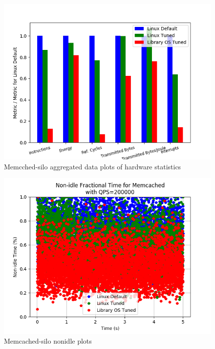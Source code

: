 \documentclass[pageno]{jpaper}
\begin{document}
\begin{figure}
	\includegraphics[width=\columnwidth]{asplos2021_figures/mcdsilo_combined_barplot_QPS200000.png}
	\caption{Memcched-silo aggregated data plots of hardware statistics}
\end{figure}
\begin{figure}
	\includegraphics[width=\columnwidth]{asplos2021_figures/mcdsilo_nonidle_QPS200000.png}
	\caption{Memcached-silo nonidle plots}
\end{figure}
%



\end{document}
